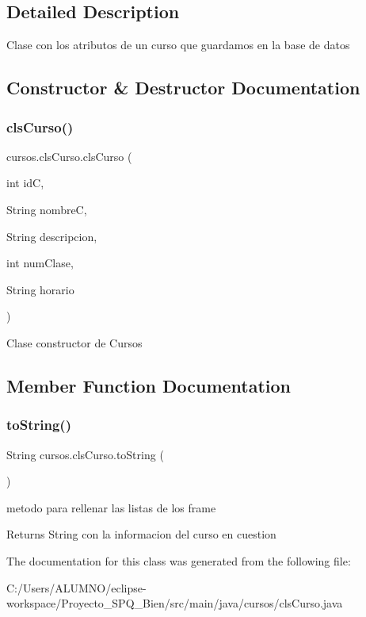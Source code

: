 \subsection{Detailed Description}
Clase con los atributos de un curso que guardamos en la base de datos 

\subsection{Constructor \& Destructor Documentation}
\mbox{\label{classcursos_1_1cls_curso_a10cb1cd33cb4c6c352fde287a982c8c4}} 
\subsubsection{\texorpdfstring{cls\+Curso()}{clsCurso()}}
{\footnotesize\ttfamily cursos.\+cls\+Curso.\+cls\+Curso (\begin{DoxyParamCaption}\item[{int}]{idC,  }\item[{String}]{nombreC,  }\item[{String}]{descripcion,  }\item[{int}]{num\+Clase,  }\item[{String}]{horario }\end{DoxyParamCaption})}

Clase constructor de Cursos 

\subsection{Member Function Documentation}
\mbox{\label{classcursos_1_1cls_curso_a68a6d3a680826cf57ab23fd4609a0cbb}} 
\subsubsection{\texorpdfstring{to\+String()}{toString()}}
{\footnotesize\ttfamily String cursos.\+cls\+Curso.\+to\+String (\begin{DoxyParamCaption}{ }\end{DoxyParamCaption})}

metodo para rellenar las listas de los frame \begin{DoxyReturn}{Returns}
String con la informacion del curso en cuestion 
\end{DoxyReturn}


The documentation for this class was generated from the following file\+:\begin{DoxyCompactItemize}
\item 
C\+:/\+Users/\+A\+L\+U\+M\+N\+O/eclipse-\/workspace/\+Proyecto\+\_\+\+S\+P\+Q\+\_\+Bien/src/main/java/cursos/cls\+Curso.\+java\end{DoxyCompactItemize}

